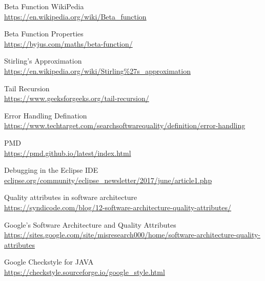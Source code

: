 \documentclass[12pt,a4paper]{report}
\begin{document}
\begin{thebibliography}{15}

Beta Function WikiPedia
\\\href{https://en.wikipedia.org/wiki/Beta\_function}{https://en.wikipedia.org/wiki/Beta\_function}

Beta Function Properties
\\\href{https://byjus.com/maths/beta-function/}{https://byjus.com/maths/beta-function/}

Stirling's Approximation
\\\href{https://en.wikipedia.org/wiki/Stirling\%27s\_approximation}{https://en.wikipedia.org/wiki/Stirling\%27s\_approximation}

Tail Recursion
\\\href{https://www.geeksforgeeks.org/tail-recursion/}{https://www.geeksforgeeks.org/tail-recursion/}

Error Handling Defination
\\\href{https://www.techtarget.com/searchsoftwarequality/definition/error-handling}{https://www.techtarget.com/searchsoftwarequality/definition/error-handling}

PMD
\\\href{https://pmd.github.io/latest/index.html}{https://pmd.github.io/latest/index.html}

Debugging in the Eclipse IDE
\\\href{eclipse.org/community/eclipse\_newsletter/2017/june/article1.php}{eclipse.org/community/eclipse\_newsletter/2017/june/article1.php}

Quality attributes in software architecture
\\\href{https://syndicode.com/blog/12-software-architecture-quality-attributes/}{https://syndicode.com/blog/12-software-architecture-quality-attributes/}

Google's Software Architecture and Quality Attributes
\\\href{https://sites.google.com/site/misresearch000/home/software-architecture-quality-attributes}{https://sites.google.com/site/misresearch000/home/software-architecture-quality-attributes}

Google Checkstyle for JAVA 
\\\href{https://checkstyle.sourceforge.io/google\_style.html}{https://checkstyle.sourceforge.io/google\_style.html}




\end{thebibliography}
\end{document}
